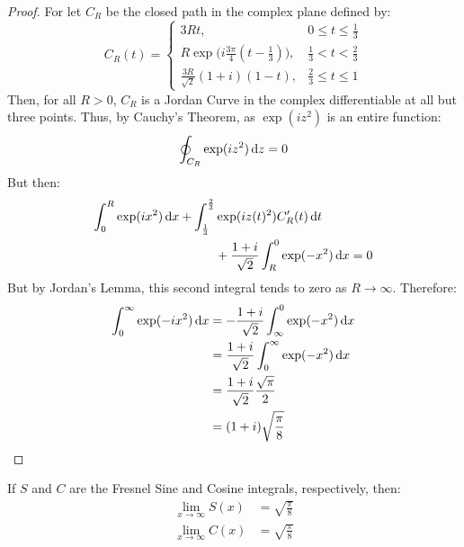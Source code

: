     \begin{proof}
        For let $C_{R}$ be the closed path in the complex plane
        defined by:
        \begin{equation}
            C_{R}(t)=
            \begin{cases}
                3Rt,&0\leq{t}\leq\frac{1}{3}\\
                R\exp\big(i\frac{3\pi}{4}(t-\frac{1}{3})\big),
                &\frac{1}{3}<t<\frac{2}{3}\\
                \frac{3R}{\sqrt{2}}(1+i)(1-t),
                &\frac{2}{3}\leq{t}\leq{1}
            \end{cases}
        \end{equation}
        Then, for all $R>0$, $C_{R}$ is a Jordan Curve in the
        complex differentiable at all but three points. Thus,
        by Cauchy's Theorem, as $\exp(iz^{2})$ is an entire
        function:
        \begin{equation}
            \oint_{C_{R}}\exp(iz^{2})\mathop{}\!\mathrm{d}{z}
            =0
        \end{equation}
        But then:
        \begin{equation}
            \begin{split}
                \int_{0}^{R}\exp(ix^{2})\mathop{}\!\mathrm{d}{x}+
                \int_{\frac{1}{3}}^{\frac{2}{3}}&
                    \exp(iz(t)^{2})C_{R}'(t)\mathop{}\!\mathrm{d}{t}\\
                &+\frac{1+i}{\sqrt{2}}\int_{R}^{0}\exp(-x^{2})\mathop{}\!\mathrm{d}{x}
                =0
            \end{split}
        \end{equation}
        But by Jordan's Lemma, this second integral tends to zero as
        $R\rightarrow\infty$. Therefore:
        \begin{align}
            \int_{0}^{\infty}\exp(-ix^{2})\mathop{}\!\mathrm{d}{x}
            &=-\frac{1+i}{\sqrt{2}}\int_{\infty}^{0}\exp(-x^{2})\mathop{}\!\mathrm{d}{x}\\
            &=\frac{1+i}{\sqrt{2}}\int_{0}^{\infty}\exp(-x^{2})\mathop{}\!\mathrm{d}{x}\\
            &=\frac{1+i}{\sqrt{2}}\frac{\sqrt{\pi}}{2}\\
            &=(1+i)\sqrt{\frac{\pi}{8}}
        \end{align}
    \end{proof}
    \begin{theorem}
        If $S$ and $C$ are the Fresnel Sine and Cosine integrals,
        respectively, then:
        \begin{align}
            \underset{x\rightarrow\infty}{\lim}S(x)
            &=\sqrt{\frac{\pi}{8}}\\
            \underset{x\rightarrow\infty}{\lim}C(x)
            &=\sqrt{\frac{\pi}{8}}
        \end{align}
    \end{theorem}
